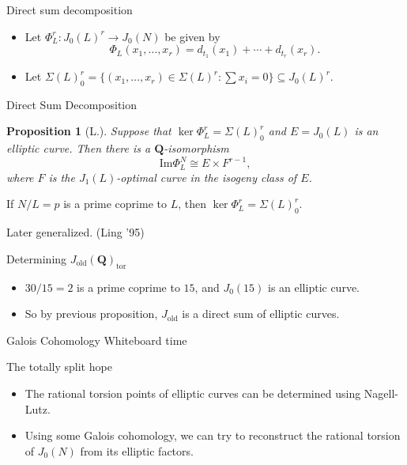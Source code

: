 \documentclass{beamer}
\newtheorem{proposition}[theorem]{Proposition}
\newcommand{\QQ}{\mathbf{Q}}
\renewcommand{\Im}{\mathrm{Im}}
\newcommand{\tor}{\mathrm{tor}}
\newcommand{\old}{\mathrm{old}}
\begin{document}
\begin{frame}{Direct sum decomposition}
    \begin{itemize}
        \item
            Let $\Phi_L ^r: J_0(L)^r \to J_0(N)$ be given by
            \[
                \Phi_L(x_1,\ldots,x_r)=d_{t_1}(x_1)+\cdots+d_{t_r}(x_r).
            \]
        \item
            Let $\Sigma(L)_0 ^r = \{(x_1,\ldots,x_r)\in \Sigma(L)^r: \sum
            x_i=0\}\subseteq J_0(L)^r$.
        \end{itemize}
\end{frame}

\begin{frame}{Direct Sum Decomposition}
    \begin{proposition}[L.]
        Suppose that $\ker\Phi_L ^r = \Sigma(L)_0 ^r$ and $E=J_0(L)$ is an elliptic
        curve. Then there is a $\QQ$-isomorphism
        \[
            \Im\Phi_L ^N \cong E \times F^{r-1},
        \]
        where $F$ is the $J_1(L)$-optimal curve in the isogeny class of $E$.
    \end{proposition}
    \begin{theorem}[Ribet '90]
        If $N/L=p$ is a prime coprime to $L$, then $\ker\Phi_L ^r = \Sigma(L)_0
        ^r$.
    \end{theorem}
    Later generalized. (Ling '95)
\end{frame}

\begin{frame}{Determining $J_\old(\QQ)_\tor$}
    \begin{itemize}
        \item
            $30/15=2$ is a prime coprime to $15$, and $J_0(15)$ is an
            elliptic curve.
        \item
            So by previous proposition, $J_\old$ is a direct sum of elliptic
            curves.
    \end{itemize}
\end{frame}

\begin{frame}[standout]{Galois Cohomology}
    \Huge{Whiteboard time}
\end{frame}

\begin{frame}{The totally split hope}
    \begin{itemize}
        \item
            The rational torsion points of elliptic curves can be determined
            using Nagell-Lutz.
        \item
            Using some Galois cohomology, we can try to reconstruct the
            rational torsion of $J_0(N)$ from its elliptic factors.
    \end{itemize}
\end{frame}
\end{document}

